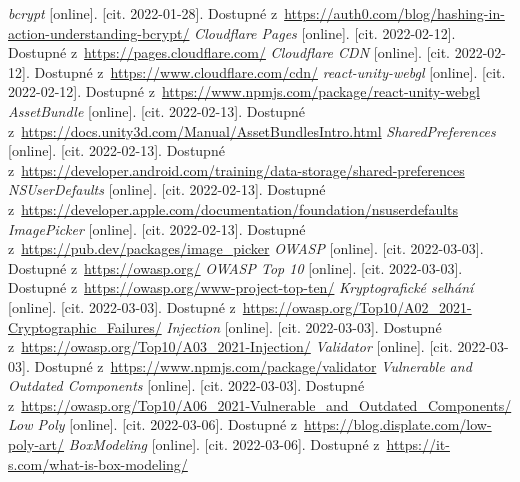 \begin{thebibliography}{99}
     \textit{bcrypt} [online]. [cit. 2022-01-28]. Dostupné z~\url{https://auth0.com/blog/hashing-in-action-understanding-bcrypt/}
     \textit{Cloudflare Pages} [online]. [cit. 2022-02-12]. Dostupné z~\url{https://pages.cloudflare.com/}
     \textit{Cloudflare CDN} [online]. [cit. 2022-02-12]. Dostupné z~\url{https://www.cloudflare.com/cdn/}
     \textit{react-unity-webgl} [online]. [cit. 2022-02-12]. Dostupné z~\url{https://www.npmjs.com/package/react-unity-webgl}
     \textit{AssetBundle} [online]. [cit. 2022-02-13]. Dostupné z~\url{https://docs.unity3d.com/Manual/AssetBundlesIntro.html}
     \textit{SharedPreferences} [online]. [cit. 2022-02-13]. Dostupné z~\url{https://developer.android.com/training/data-storage/shared-preferences}
     \textit{NSUserDefaults} [online]. [cit. 2022-02-13]. Dostupné z~\url{https://developer.apple.com/documentation/foundation/nsuserdefaults}
     \textit{ImagePicker} [online]. [cit. 2022-02-13]. Dostupné z~\url{https://pub.dev/packages/image_picker}
     \textit{OWASP} [online]. [cit. 2022-03-03]. Dostupné z~\url{https://owasp.org/}
     \textit{OWASP Top 10} [online]. [cit. 2022-03-03]. Dostupné z~\url{https://owasp.org/www-project-top-ten/}
     \textit{Kryptografické selhání} [online]. [cit. 2022-03-03]. Dostupné z~\url{https://owasp.org/Top10/A02_2021-Cryptographic_Failures/}
     \textit{Injection} [online]. [cit. 2022-03-03]. Dostupné z~\url{https://owasp.org/Top10/A03_2021-Injection/}
     \textit{Validator} [online]. [cit. 2022-03-03]. Dostupné z~\url{https://www.npmjs.com/package/validator}
     \textit{Vulnerable and Outdated Components} [online]. [cit. 2022-03-03]. Dostupné z~\url{https://owasp.org/Top10/A06_2021-Vulnerable_and_Outdated_Components/}
     \textit{Low Poly} [online]. [cit. 2022-03-06]. Dostupné z~\url{https://blog.displate.com/low-poly-art/}
     \textit{BoxModeling} [online]. [cit. 2022-03-06]. Dostupné z~\url{https://it-s.com/what-is-box-modeling/}
\end{thebibliography}